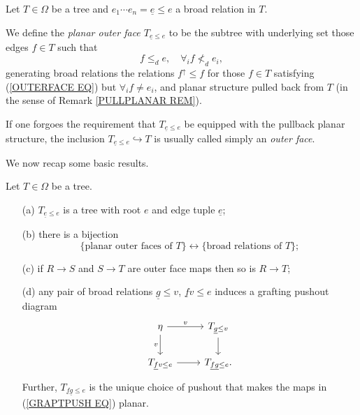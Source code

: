 \documentclass[a4paper,10pt]{article}%
\begin{document}
\begin{definition}\label{OUTFACE DEF}
	Let $T \in \Omega$ be a tree and 
	$e_1 \cdots e_n =\underline{e} \leq e$ a broad relation in $T$.
	
	We define the \textit{planar outer face $T_{\underline{e} \leq e}$}
	to be the subtree with underlying set those edges $f \in T$ such that
\begin{equation}\label{OUTERFACE EQ}
	f \leq_d e,\quad \forall_i f \nless_d e_i,
\end{equation}
generating broad relations the relations $f^{\uparrow} \leq f$ for those $f \in T$ satisfying (\ref{OUTERFACE EQ}) but 
$\forall_i f\neq e_i$,
and planar structure pulled back from $T$ (in the sense of Remark \ref{PULLPLANAR REM}).
\end{definition}


\begin{remark}
If one forgoes the requirement that $T_{\underline{e} \leq e}$ be equipped with the pullback planar structure, the inclusion $T_{\underline{e} \leq e} \hookrightarrow T$ is usually called simply an \textit{outer face}.
\end{remark}


We now recap some basic results.

\begin{proposition}
Let $T \in \Omega$ be a tree.
\begin{itemize}
\item[(a)] $T_{\underline{e} \leq e}$ is a tree with root $e$
and edge tuple $\underline{e}$;
\item[(b)] there is a bijection
\[
	\{\text{planar outer faces of $T$} \} 
\leftrightarrow 
	\{\text{broad relations of $T$}\};
\]
\item[(c)] if $R \to S$ and $S \to T$ are outer face maps then so is $R \to T$;
\item[(d)] any pair of broad relations $\underline{g} \leq v$, $\underline{f}v \leq e$ induces a grafting pushout diagram
\begin{equation}\label{GRAPTPUSH EQ}
\begin{tikzcd}
	\eta \ar{r}{v} \ar{d}[swap]{v} & T_{\underline{g} \leq v} \ar{d}
\\
	T_{\underline{f}v \leq e} \ar{r} & T_{\underline{f}\underline{g} \leq e}.
\end{tikzcd}
\end{equation}
Further, $T_{\underline{f} \underline{g} \leq e}$ is the
unique choice of pushout that makes the maps in (\ref{GRAPTPUSH EQ}) planar.
\end{itemize}
\end{proposition}
\end{document}
